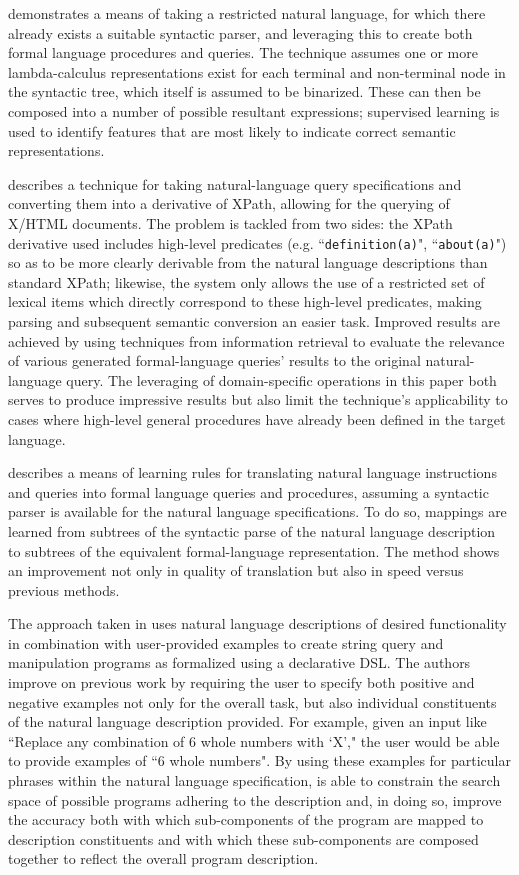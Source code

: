 \documentclass[a4paper,11pt]{proposal}
\begin{document}
\cite{ge2009} demonstrates a means of taking a restricted natural language, for which there already exists a suitable syntactic parser, and leveraging this to create both formal language procedures and queries. The technique assumes one or more lambda-calculus representations exist for each terminal and non-terminal node in the syntactic tree, which itself is assumed to be binarized. These can then be composed into a number of possible resultant expressions; supervised learning is used to identify features that are most likely to indicate correct semantic representations.

\cite{tannier2005} describes a technique for taking natural-language query specifications and converting them into a derivative of XPath, allowing for the querying of X/HTML documents. The problem is tackled from two sides: the XPath derivative used includes high-level predicates (e.g. ``\texttt{definition(a)}", ``\texttt{about(a)}") so as to be more clearly derivable from the natural language descriptions than standard XPath; likewise, the system only allows the use of a restricted set of lexical items which directly correspond to these high-level predicates, making parsing and subsequent semantic conversion an easier task. Improved results are achieved by using techniques from information retrieval to evaluate the relevance of various generated formal-language queries' results to the original natural-language query. The leveraging of domain-specific operations in this paper both serves to produce impressive results but also limit the technique's applicability to cases where high-level general procedures have already been defined in the target language.

\cite{kate2005} describes a means of learning rules for translating natural language instructions and queries into formal language queries and procedures, assuming a syntactic parser is available for the natural language specifications. To do so, mappings are learned from subtrees of the syntactic parse of the natural language description to subtrees of the equivalent formal-language representation. The method shows an improvement not only in quality of translation but also in speed versus previous methods.

The approach taken in \cite{raza2015} uses natural language descriptions of desired functionality in combination with user-provided examples to create string query and manipulation programs as formalized using a declarative DSL. The authors improve on previous work by requiring the user to specify both positive and negative examples not only for the overall task, but also individual constituents of the natural language description provided. For example, given an input like ``Replace any combination of 6 whole numbers with `X'," the user would be able to provide examples of ``6 whole numbers". By using these examples for particular phrases within the natural language specification, \cite{raza2015} is able to constrain the search space of possible programs adhering to the description and, in doing so, improve the accuracy both with which sub-components of the program are mapped to description constituents and with which these sub-components are composed together to reflect the overall program description.
\end{document}
